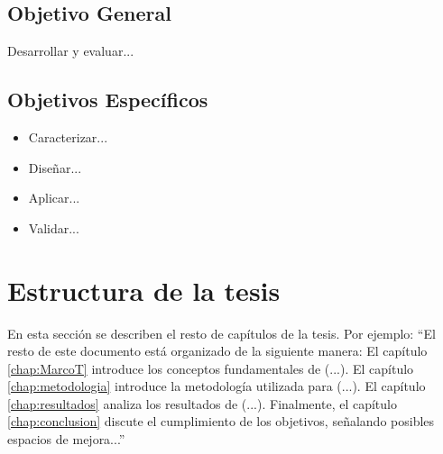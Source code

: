 \subsection{Objetivo General}
Desarrollar y evaluar...
\subsection{Objetivos Específicos}
\begin{itemize}
    \item Caracterizar...
    \item Diseñar...
    \item Aplicar...
    \item Validar...
\end{itemize}
\section{Estructura de la tesis}
En esta sección se describen el resto de capítulos de la tesis. Por ejemplo: ``El resto de este documento está organizado de la siguiente manera: El capítulo \ref{chap:MarcoT} introduce los conceptos fundamentales de (...). El capítulo \ref{chap:metodologia} introduce la metodología utilizada para (...). El capítulo \ref{chap:resultados} analiza los resultados de (...). Finalmente, el capítulo \ref{chap:conclusion} discute el cumplimiento de los objetivos, señalando posibles espacios de mejora...''
